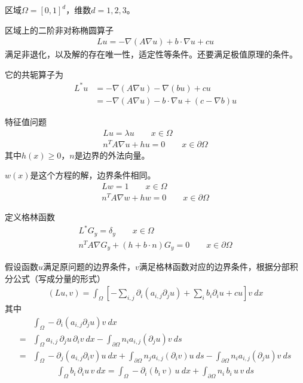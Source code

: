 \documentclass[12pt,a4paper]{article}
\begin{document}
\maketitle

区域$\Omega = [0,1]^d$，维数$d = 1, 2, 3$。

区域上的二阶非对称椭圆算子
\begin{align*}
L u = -\nabla(A \nabla u) + b \cdot \nabla u + c u
\end{align*}
满足非退化，以及解的存在唯一性，适定性等条件。还要满足极值原理的条件。

它的共轭算子为
\begin{align*}
L^{*} u & = -\nabla(A \nabla u) - \nabla (b u) + c u \\
& = -\nabla(A \nabla u) - b \cdot \nabla u + (c - \nabla b) u
\end{align*}

特征值问题
\begin{align*}
L u = \lambda u \qquad x \in \Omega \\
n^T A \nabla u + h u = 0 \qquad x \in \partial \Omega
\end{align*}
其中$h(x) \geq 0$，$n$是边界的外法向量。

$w(x)$是这个方程的解，边界条件相同。
\begin{align*}
L w = 1 \qquad x \in \Omega \\
n^T A \nabla w + h w = 0 \qquad x \in \partial \Omega
\end{align*}

定义格林函数
\begin{align*}
L^{*} G_y = \delta_y \qquad x \in \Omega \\
n^T A \nabla G_y + (h + b \cdot n) G_y = 0 \qquad x \in \partial \Omega
\end{align*}

假设函数$u$满足原问题的边界条件，$v$满足格林函数对应的边界条件，根据分部积分公式（写成分量的形式）
\begin{align*}
(L u, v) = \int_\Omega [-\sum_{i,j} \partial_i (a_{i,j} \partial_j u) + \sum_{i} b_i \partial_i u + c u] v \ dx
\end{align*}
其中
\begin{align*}
& \int_\Omega - \partial_i (a_{i,j} \partial_j u) v \ dx \\
= & \int_\Omega a_{i,j} \, \partial_j u \, \partial_i v \ dx - \int_{\partial \Omega} n_i a_{i,j} (\partial_j u) v \ ds \\
= & \int_\Omega - \partial_j (a_{i,j} \partial_i v) u \ dx + \int_{\partial \Omega} n_j a_{i,j} (\partial_i v) u \ ds - \int_{\partial \Omega} n_i a_{i,j} (\partial_j u) v \ ds
\end{align*}
\begin{align*}
\int_\Omega b_i \, \partial_i u \, v \ dx = \int_\Omega - \partial_i (b_i \, v) \, u \ dx + \int_{\partial \Omega} n_i \, b_i \, u \, v \ ds
\end{align*}
\end{document}
